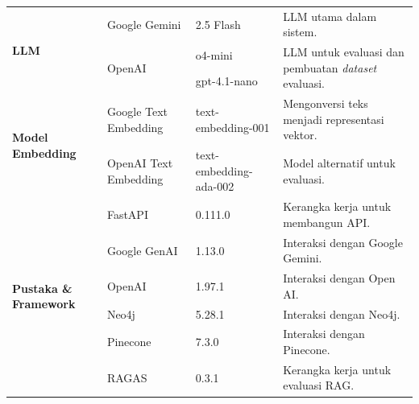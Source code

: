 \begin{longtable}{
	@{}p{2.5cm}
	p{2.5cm}
	p{3cm}
	p{\textwidth - 2.5cm - 2.5cm - 3cm - 6\tabcolsep}@{}}
	\multirow{3}{*}{\textbf{LLM}}                  & Google Gemini            & 2.5 Flash                    & LLM utama dalam sistem.                                                      \\
	                                               & \multirow{2}{*}{OpenAI}  & o4-mini                      & \multirow{2}{=}{LLM untuk evaluasi dan pembuatan \textit{dataset} evaluasi.} \\
	                                               &                          & gpt-4.1-nano                 &                                                                              \\ \midrule

	\multirow{2}{=}{\textbf{Model Embedding}}      & Google Text Embedding    & text-embedding-001           & Mengonversi teks menjadi representasi vektor.                                \\
	                                               & OpenAI Text Embedding    & text-embedding-ada-002       & Model alternatif untuk evaluasi.                                             \\ \midrule

	\multirow{6}{=}{\textbf{Pustaka \& Framework}} & FastAPI                  & 0.111.0                      & Kerangka kerja untuk membangun API.                                          \\
	                                               & Google GenAI             & 1.13.0                       & Interaksi dengan Google Gemini.                                              \\
	                                               & OpenAI                   & 1.97.1                       & Interaksi dengan Open AI.                                                    \\
	                                               & Neo4j                    & 5.28.1                       & Interaksi dengan Neo4j.                                                      \\
	                                               & Pinecone                 & 7.3.0                        & Interaksi dengan Pinecone.                                                   \\
	                                               & RAGAS                    & 0.3.1                        & Kerangka kerja untuk evaluasi RAG.                                           \\ \bottomrule
\end{longtable}

